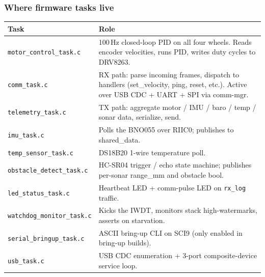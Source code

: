 \subsubsection{Where firmware tasks live}

\begin{center}
\begin{tabular}{|p{4.5cm}|p{10.0cm}|}
\hline
\textbf{Task}                                  & \textbf{Role}                                                                                                                          \\
\hline
\texttt{motor\_control\_task.c}                & 100\,Hz closed-loop PID on all four wheels. Reads encoder velocities, runs PID, writes duty cycles to DRV8263.                          \\
\texttt{comm\_task.c}                          & RX path: parse incoming frames, dispatch to handlers (set\_velocity, ping, reset, etc.). Active over USB CDC + UART + SPI via comm-mgr.   \\
\texttt{telemetry\_task.c}                     & TX path: aggregate motor / IMU / baro / temp / sonar data, serialize, send.                                                              \\
\texttt{imu\_task.c}                           & Polls the BNO055 over RIIC0; publishes to shared\_data.                                                                                  \\
\texttt{temp\_sensor\_task.c}                  & DS18B20 1-wire temperature poll.                                                                                                         \\
\texttt{obstacle\_detect\_task.c}              & HC-SR04 trigger / echo state machine; publishes per-sonar range\_mm and obstacle bool.                                                  \\
\texttt{led\_status\_task.c}                   & Heartbeat LED + comm-pulse LED on \texttt{rx\_log} traffic.                                                                              \\
\texttt{watchdog\_monitor\_task.c}             & Kicks the IWDT, monitors stack high-watermarks, asserts on starvation.                                                                  \\
\texttt{serial\_bringup\_task.c}               & ASCII bring-up CLI on SCI9 (only enabled in bring-up builds).                                                                            \\
\texttt{usb\_task.c}                           & USB CDC enumeration + 3-port composite-device service loop.                                                                              \\
\hline
\end{tabular}
\end{center}

